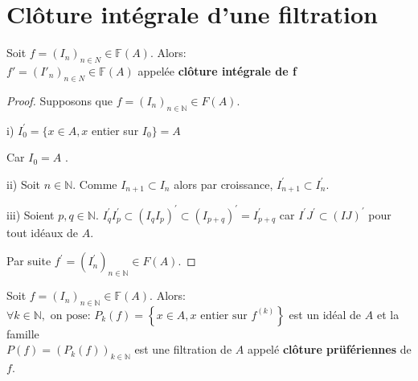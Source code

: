 \section{Clôture intégrale d'une filtration}
\begin{maproposition}
	Soit $f=(I_n)_{n \in N} \in \mathbb{F}(A).$ Alors:\\
	$f'=(I'_n)_{n \in N} \in \mathbb{F}(A)$ appelée \textbf{clôture intégrale de f}
\end{maproposition}
\begin{proof}
	Supposons que $f=(I_{n})_{n\in \mathbb{N}}\in F(A).$
	
	i) $I_{0}^{\prime }=\{x\in A,x$ entier sur $I_{0}\}=A$
	
	Car $I_{0}=A$ $.$
	
	ii) Soit $n\in \mathbb{N}.$
	Comme $I_{n+1}\subset I_{n}$ alors par croissance, $I_{n+1}^{\prime }\subset I_{n}^{\prime }.$
	
	iii) Soient $p,q\in \mathbb{N}.$
	$I_{q}^{\prime }I_{p}^{\prime }\subset (I_{q}I_{p})^{\prime }\subset
	(I_{p+q})^{\prime }=I_{p+q}^{\prime }$ car $I^{\prime }J^{\prime }\subset
	(IJ)^{\prime }$ pour tout idéaux de $A.$
	
	Par suite $f^{\prime }=(I_{n}^{\prime })_{n\in \mathbb{N}}\in F(A).$
\end{proof}
\begin{moncorollaire}
	Soit $f=(I_n)_{n \in \mathbb{N}} \in \mathbb{F}(A)$. Alors:\\
	$\forall k \in \mathbb{N}, \text{ on pose: } P_k(f)=\left\{x \in A, x \text{ entier sur } f^{(k)}\right\}$ est un idéal de $A$ et la famille \\ $P(f)=(P_k(f))_{k \in \mathbb{N}}$ est une filtration de $A$ appelé \textbf{clôture prüfériennes} de $f$.
\end{moncorollaire}
